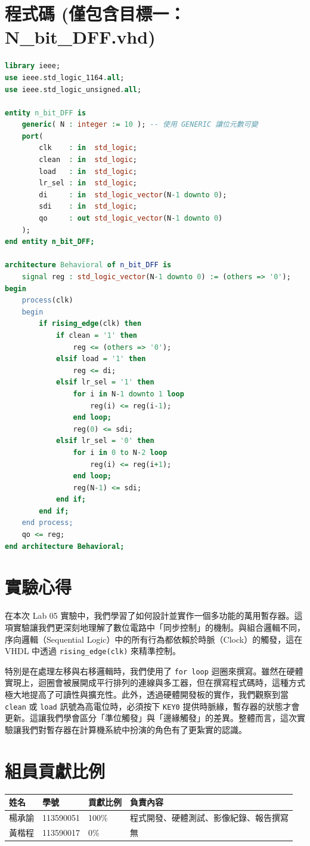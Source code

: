 \documentclass[12pt, a4paper]{article}
\begin{document}
\section{程式碼 (僅包含目標一：N\_bit\_DFF.vhd)}
\begin{lstlisting}[language=VHDL]
library ieee;
use ieee.std_logic_1164.all;
use ieee.std_logic_unsigned.all;

entity n_bit_DFF is
    generic( N : integer := 10 ); -- 使用 GENERIC 讓位元數可變
    port( 
        clk    : in  std_logic;
        clean  : in  std_logic;
        load   : in  std_logic;
        lr_sel : in  std_logic;
        di     : in  std_logic_vector(N-1 downto 0);
        sdi    : in  std_logic;
        qo     : out std_logic_vector(N-1 downto 0)
    );
end entity n_bit_DFF;

architecture Behavioral of n_bit_DFF is
    signal reg : std_logic_vector(N-1 downto 0) := (others => '0');
begin
    process(clk)
    begin
        if rising_edge(clk) then
            if clean = '1' then
                reg <= (others => '0');
            elsif load = '1' then
                reg <= di;
            elsif lr_sel = '1' then
                for i in N-1 downto 1 loop
                    reg(i) <= reg(i-1);
                end loop;
                reg(0) <= sdi;
            elsif lr_sel = '0' then
                for i in 0 to N-2 loop
                    reg(i) <= reg(i+1);
                end loop;
                reg(N-1) <= sdi;
            end if;
        end if;
    end process;
    qo <= reg;
end architecture Behavioral;
\end{lstlisting}

\section{實驗心得}
在本次 Lab 05 實驗中，我們學習了如何設計並實作一個多功能的萬用暫存器。這項實驗讓我們更深刻地理解了數位電路中「同步控制」的機制。與組合邏輯不同，序向邏輯（Sequential Logic）中的所有行為都依賴於時脈（Clock）的觸發，這在 VHDL 中透過 \texttt{rising\_edge(clk)} 來精準控制。

特別是在處理左移與右移邏輯時，我們使用了 \texttt{for loop} 迴圈來撰寫。雖然在硬體實現上，迴圈會被展開成平行排列的連線與多工器，但在撰寫程式碼時，這種方式極大地提高了可讀性與擴充性。此外，透過硬體開發板的實作，我們觀察到當 \texttt{clean} 或 \texttt{load} 訊號為高電位時，必須按下 \texttt{KEY0} 提供時脈緣，暫存器的狀態才會更新。這讓我們學會區分「準位觸發」與「邊緣觸發」的差異。整體而言，這次實驗讓我們對暫存器在計算機系統中扮演的角色有了更紮實的認識。

\section{組員貢獻比例}
\begin{table}[H]
\centering
\begin{tabular}{@{}llll@{}}
\toprule
姓名 & 學號 & 貢獻比例 & 負責內容 \\
\midrule
楊承諭 & 113590051 & 100\% & 程式開發、硬體測試、影像紀錄、報告撰寫 \\
黃楷程 & 113590017 & 0\% & 無 \\
\bottomrule
\end{tabular}
\end{table}
\end{document}
